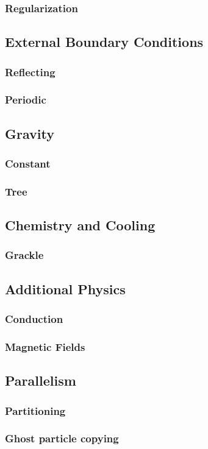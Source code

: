 \subsubsection{Regularization}

\subsection{External Boundary Conditions}
\subsubsection{Reflecting}
\subsubsection{Periodic}

\subsection{Gravity}
\subsubsection{Constant}
\subsubsection{Tree}

\subsection{Chemistry and Cooling}
\subsubsection{Grackle}

\subsection{Additional Physics}
\subsubsection{Conduction}
\subsubsection{Magnetic Fields}

\subsection{Parallelism}
\subsubsection{Partitioning}
\subsubsection{Ghost particle copying}
